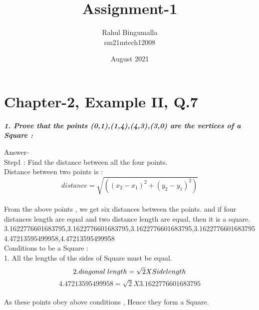 \documentclass[20pts]{article}
\title{\textbf{\huge Assignment-1}}
\author{ Rahul Bingumalla\\ sm21mtech12008}
\date{August 2021}
\begin{document}
\maketitle{}

\section{Chapter-2, Example II, Q.7}
\vspace{1cm}

\textbf{\textsl{1. Prove that the points (0,1),(1,4),(4,3),(3,0) are the vertices of a Square  :}}

\vspace{1cm}

 Answer- 
 \\ Step1 : Find the distance between all the four points.  
 \\ Distance between two points is :
 $$ distance = \sqrt{((x_2-x_1)^2+(y_2-y_1)^2)}$$
\\ From the above points , we get six distances between the points.
 and if four distances length are equal and two distance length are equal, then it is a square.
 \vspace{0.2cm}
 \\{3.1622776601683795,3.1622776601683795,3.1622776601683795,3.1622776601683795 4.47213595499958,4.47213595499958}
 \vspace{0.2cm} 
\\ Conditions to be a Square :
\\ 1. All the lengths of the sides of Square must be equal.
$$ 2. diagonal \hspace{0.1cm} length =\sqrt{2} X Side length$$
 $$4.47213595499958 =\sqrt{2} X 3.1622776601683795$$
\\As these points obey above conditions , Hence they form a Square.
\end{document}

